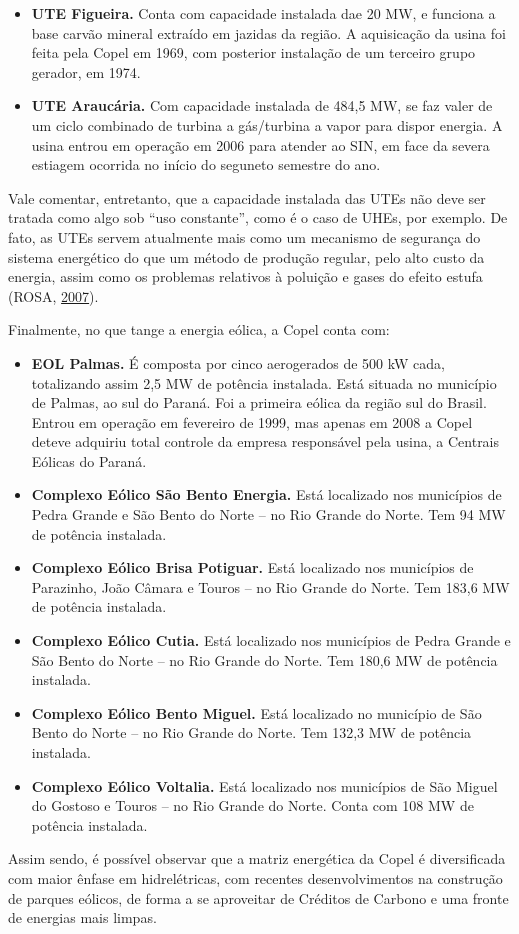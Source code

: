 \documentclass[aprovado,numbers]{coppe}
\providecommand{\tightlist}{%
  \setlength{\itemsep}{0pt}\setlength{\parskip}{0pt}}
\begin{document}
  \begin{itemize}
  \tightlist
  \item
    \textbf{UTE Figueira.} Conta com capacidade instalada dae 20 MW, e funciona a base carvão mineral extraído em jazidas da região. A aquisicação da usina foi feita pela Copel em 1969, com posterior instalação de um terceiro grupo gerador, em 1974.
  \item
    \textbf{UTE Araucária.} Com capacidade instalada de 484,5 MW, se faz valer de um ciclo combinado de turbina a gás/turbina a vapor para dispor energia. A usina entrou em operação em 2006 para atender ao SIN, em face da severa estiagem ocorrida no início do seguneto semestre do ano.
  \end{itemize}
  Vale comentar, entretanto, que a capacidade instalada das UTEs não deve ser tratada como algo sob ``uso constante'', como é o caso de UHEs, por exemplo. De fato, as UTEs servem atualmente mais como um mecanismo de segurança do sistema energético do que um método de produção regular, pelo alto custo da energia, assim como os problemas relativos à poluição e gases do efeito estufa (ROSA, \protect\hyperlink{ref-rosa2007}{2007}).

  Finalmente, no que tange a energia eólica, a Copel conta com:
  \begin{itemize}
  \tightlist
  \item
    \textbf{EOL Palmas.} É composta por cinco aerogerados de 500 kW cada, totalizando assim 2,5 MW de potência instalada. Está situada no município de Palmas, ao sul do Paraná. Foi a primeira eólica da região sul do Brasil. Entrou em operação em fevereiro de 1999, mas apenas em 2008 a Copel deteve adquiriu total controle da empresa responsável pela usina, a Centrais Eólicas do Paraná.
  \item
    \textbf{Complexo Eólico São Bento Energia.} Está localizado nos municípios de Pedra Grande e São Bento do Norte -- no Rio Grande do Norte. Tem 94 MW de potência instalada.
  \item
    \textbf{Complexo Eólico Brisa Potiguar.} Está localizado nos municípios de Parazinho, João Câmara e Touros -- no Rio Grande do Norte. Tem 183,6 MW de potência instalada.
  \item
    \textbf{Complexo Eólico Cutia.} Está localizado nos municípios de Pedra Grande e São Bento do Norte -- no Rio Grande do Norte. Tem 180,6 MW de potência instalada.
  \item
    \textbf{Complexo Eólico Bento Miguel.} Está localizado no município de São Bento do Norte -- no Rio Grande do Norte. Tem 132,3 MW de potência instalada.
  \item
    \textbf{Complexo Eólico Voltalia.} Está localizado nos municípios de São Miguel do Gostoso e Touros -- no Rio Grande do Norte. Conta com 108 MW de potência instalada.
  \end{itemize}
  Assim sendo, é possível observar que a matriz energética da Copel é diversificada com maior ênfase em hidrelétricas, com recentes desenvolvimentos na construção de parques eólicos, de forma a se aproveitar de Créditos de Carbono e uma fronte de energias mais limpas.
\end{document}
